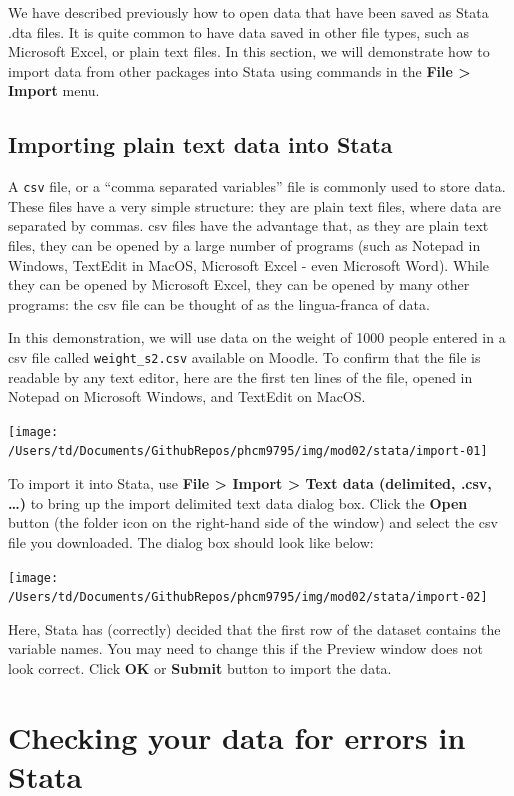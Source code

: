 \documentclass[
]{memoir}
\begin{document}
We have described previously how to open data that have been saved as Stata .dta files. It is quite common to have data saved in other file types, such as Microsoft Excel, or plain text files. In this section, we will demonstrate how to import data from other packages into Stata using commands in the \textbf{File \textgreater{} Import} menu.

\hypertarget{importing-plain-text-data-into-stata}{%
\subsection{Importing plain text data into Stata}\label{importing-plain-text-data-into-stata}}

A \texttt{csv} file, or a ``comma separated variables'' file is commonly used to store data. These files have a very simple structure: they are plain text files, where data are separated by commas. csv files have the advantage that, as they are plain text files, they can be opened by a large number of programs (such as Notepad in Windows, TextEdit in MacOS, Microsoft Excel - even Microsoft Word). While they can be opened by Microsoft Excel, they can be opened by many other programs: the csv file can be thought of as the lingua-franca of data.

In this demonstration, we will use data on the weight of 1000 people entered in a csv file called \texttt{weight\_s2.csv} available on Moodle.
To confirm that the file is readable by any text editor, here are the first ten lines of the file, opened in Notepad on Microsoft Windows, and TextEdit on MacOS.

\texttt{[image: /Users/td/Documents/GithubRepos/phcm9795/img/mod02/stata/import-01]}

To import it into Stata, use \textbf{File \textgreater{} Import \textgreater{} Text data (delimited, .csv, \ldots)} to bring up the import delimited text data dialog box. Click the \textbf{Open} button (the folder icon on the right-hand side of the window) and select the csv file you downloaded. The dialog box should look like below:

\texttt{[image: /Users/td/Documents/GithubRepos/phcm9795/img/mod02/stata/import-02]}

Here, Stata has (correctly) decided that the first row of the dataset contains the variable names. You may need to change this if the Preview window does not look correct. Click \textbf{OK} or \textbf{Submit} button to import the data.

\hypertarget{checking-your-data-for-errors-in-stata}{%
\section{Checking your data for errors in Stata}\label{checking-your-data-for-errors-in-stata}}
\end{document}
